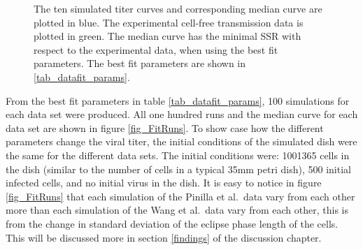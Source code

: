 \begin{figure}
\centering
\caption{The ten simulated titer curves and corresponding median curve are plotted in blue. The experimental cell-free transmission data \citep{pinilla12} is plotted in green. The median curve has the minimal SSR with respect to the experimental data, when using the best fit parameters. The best fit parameters are shown in \ref{tab_datafit_params}. \label{fig_DataFit}}
\end{figure}

From the best fit parameters in table \ref{tab_datafit_params}, 100 simulations for each data set were produced. All one hundred runs and the median curve for each data set are shown in figure \ref{fig_FitRuns}. To show case how the different parameters change the viral titer, the initial conditions of the simulated dish were the same for the different data sets. The initial conditions were: 1001365 cells in the dish (similar to the number of cells in a typical 35mm petri dish), 500 initial infected cells, and no initial virus in the dish. It is easy to notice in figure \ref{fig_FitRuns} that each simulation of the Pinilla et al.\ data vary from each other more than each simulation of the Wang et al.\ data vary from each other, this is from the change in standard deviation of the eclipse phase length of the cells. This will be discussed more in section \ref{findings} of the discussion chapter.

